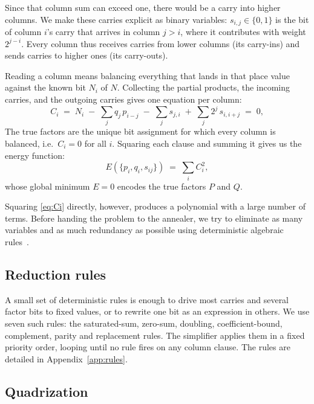 \documentclass[reprint,twocolumn,amsmath,amssymb,nofootinbib]{revtex4-2}
\begin{document}
Since that column sum can exceed one, there would be a carry into higher columns. We make these carries explicit as binary variables: $s_{i,j} \in \{0,1\}$ is the bit of column $i$'s carry that arrives in column $j > i$, where it contributes with weight $2^{j-i}$. Every column thus receives carries from lower columns (its carry-ins) and sends carries to higher ones (its carry-outs).

Reading a column means balancing everything that lands in that place value against the known bit $N_i$ of $N$. Collecting the partial products, the incoming carries, and the outgoing carries gives one equation per column:
\begin{equation}
  C_i \;=\; N_i \;-\; \sum_j q_j\, p_{i-j}
            \;-\; \sum_j s_{j,i}
            \;+\; \sum_j 2^{j}\, s_{i,i+j} \;=\; 0,
  \label{eq:Ci}
\end{equation}
The true factors are the unique bit assignment for which every column is balanced, i.e.\ $C_i = 0$ for all $i$. Squaring each clause and summing it gives us the energy function:
\begin{equation}
  E(\{p_i, q_i, s_{ij}\}) \;=\; \sum_i C_i^2,
  \label{eq:energy}
\end{equation}
whose global minimum $E = 0$ encodes the true factors $P$ and $Q$.

Squaring \eqref{eq:Ci} directly, however, produces a polynomial with a large number of terms. Before handing the problem to the annealer, we try to eliminate as many variables and as much redundancy as possible using deterministic algebraic rules~\cite{Jiang2018}.

\subsection{Reduction rules}\label{sec:rules}

A small set of deterministic rules is enough to drive most carries and several factor bits to fixed values, or to rewrite one bit as an expression in others. We use seven such rules: the saturated-sum, zero-sum, doubling, coefficient-bound, complement, parity and replacement rules. The simplifier applies them in a fixed priority order, looping until no rule fires on any column clause. The rules are detailed in Appendix~\ref{app:rules}.

\subsection{Quadrization}\label{sec:quad}
\end{document}
